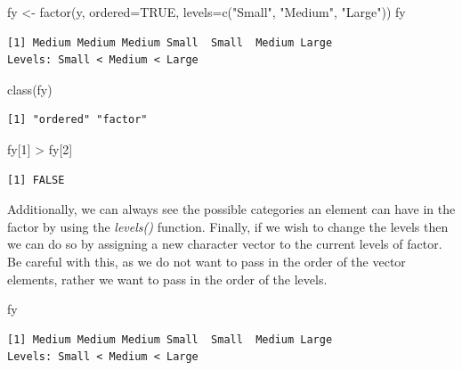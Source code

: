 \documentclass[
  letterpaper,
  DIV=11,
  numbers=noendperiod]{scrreprt}
\newenvironment{Shaded}{\begin{snugshade}}{\end{snugshade}}
\newcommand{\AttributeTok}[1]{\textcolor[rgb]{0.40,0.45,0.13}{#1}}
\newcommand{\ConstantTok}[1]{\textcolor[rgb]{0.56,0.35,0.01}{#1}}
\newcommand{\DecValTok}[1]{\textcolor[rgb]{0.68,0.00,0.00}{#1}}
\newcommand{\FunctionTok}[1]{\textcolor[rgb]{0.28,0.35,0.67}{#1}}
\newcommand{\NormalTok}[1]{\textcolor[rgb]{0.00,0.23,0.31}{#1}}
\newcommand{\OtherTok}[1]{\textcolor[rgb]{0.00,0.23,0.31}{#1}}
\newcommand{\SpecialCharTok}[1]{\textcolor[rgb]{0.37,0.37,0.37}{#1}}
\newcommand{\StringTok}[1]{\textcolor[rgb]{0.13,0.47,0.30}{#1}}
\begin{document}
\begin{Shaded}
\begin{Highlighting}[]
\NormalTok{fy }\OtherTok{\textless{}{-}} \FunctionTok{factor}\NormalTok{(y, }\AttributeTok{ordered=}\ConstantTok{TRUE}\NormalTok{, }\AttributeTok{levels=}\FunctionTok{c}\NormalTok{(}\StringTok{"Small"}\NormalTok{, }\StringTok{"Medium"}\NormalTok{, }\StringTok{"Large"}\NormalTok{))}
\NormalTok{fy}
\end{Highlighting}
\end{Shaded}

\begin{verbatim}
[1] Medium Medium Medium Small  Small  Medium Large 
Levels: Small < Medium < Large
\end{verbatim}

\begin{Shaded}
\begin{Highlighting}[]
\FunctionTok{class}\NormalTok{(fy)}
\end{Highlighting}
\end{Shaded}

\begin{verbatim}
[1] "ordered" "factor" 
\end{verbatim}

\begin{Shaded}
\begin{Highlighting}[]
\NormalTok{fy[}\DecValTok{1}\NormalTok{] }\SpecialCharTok{\textgreater{}}\NormalTok{ fy[}\DecValTok{2}\NormalTok{]}
\end{Highlighting}
\end{Shaded}

\begin{verbatim}
[1] FALSE
\end{verbatim}

Additionally, we can always see the possible categories an element can
have in the factor by using the \emph{levels()} function. Finally, if we
wish to change the levels then we can do so by assigning a new character
vector to the current levels of factor. Be careful with this, as we do
not want to pass in the order of the vector elements, rather we want to
pass in the order of the levels.

\begin{Shaded}
\begin{Highlighting}[]
\NormalTok{fy}
\end{Highlighting}
\end{Shaded}

\begin{verbatim}
[1] Medium Medium Medium Small  Small  Medium Large 
Levels: Small < Medium < Large
\end{verbatim}
\end{document}
